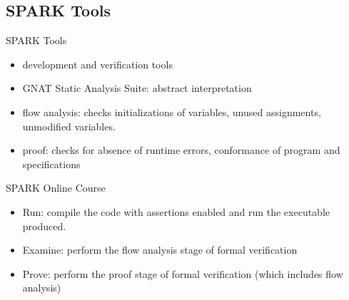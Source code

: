 \subsection{SPARK Tools}
\begin{frame}{\insertsubsection}
	\begin{fancycolumns}
		\begin{definition}{SPARK Tools \mysource{\introtospark}}
			\begin{itemize}
				\item development and verification tools
				\item GNAT Static Analysis Suite: abstract interpretation
				\item flow analysis: checks initializations of variables, unused assignments, unmodified variables.
				\item proof: checks for absence of runtime errors, conformance of program and specifications
			\end{itemize}
		\end{definition}
	\nextcolumn
		\begin{example}{SPARK Online Course \mysource{\introtospark}}
			\begin{itemize}
				\item Run: compile the code with assertions enabled and run the executable produced.
				\item Examine: perform the flow analysis stage of formal verification
				\item Prove: perform the proof stage of formal verification (which includes flow analysis)
			\end{itemize}
		\end{example}
	\end{fancycolumns}
\end{frame}

